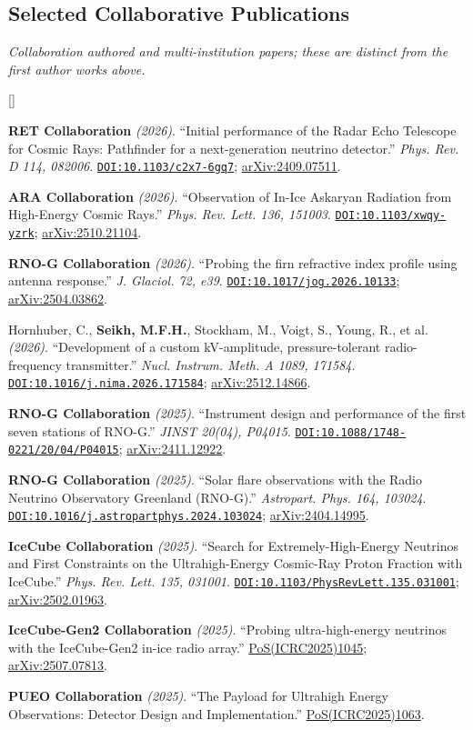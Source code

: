 \documentclass[10pt,letterpaper]{report}
\newcommand{\cvdate}[1]{{\normalfont\itshape\color{Muted}(#1)}}
\newcounter{cvitemrank}
\newenvironment{cvnumbered}[1]{%
  \setcounter{cvitemrank}{#1}%
  \begin{list}{\textcolor{Muted}{[\arabic{cvitemrank}]}}{%
    \setlength{\leftmargin}{2.25em}\setlength{\labelwidth}{1.65em}
    \setlength{\labelsep}{0.45em}\setlength{\itemindent}{0pt}
    \setlength{\itemsep}{0.3pt}\setlength{\topsep}{1.5pt}
    \setlength{\parsep}{0pt}\setlength{\partopsep}{0pt}}%
}{\end{list}}
\newcommand{\cvnumitem}{\item\addtocounter{cvitemrank}{-1}}
\newenvironment{cvpubnumbered}[1]{\begin{cvnumbered}{#1}\setlength{\itemsep}{2.2pt}\setlength{\topsep}{3pt}}{\end{cvnumbered}}
\newcommand{\doi}[1]{{\urlstyle{tt}\href{https://doi.org/#1}{\nolinkurl{DOI:#1}}}}
\newcommand{\arxiv}[1]{\href{https://arxiv.org/abs/#1}{arXiv:#1}}
\begin{document}
\subsection*{Selected Collaborative Publications}
\noindent\textit{Collaboration authored and multi-institution papers; these are distinct from the first author works above.}\vspace{2mm}
\begin{cvpubnumbered}{12}
    \cvnumitem \textbf{RET Collaboration} \cvdate{2026}. ``Initial performance of the Radar Echo Telescope for Cosmic Rays: Pathfinder for a next-generation neutrino detector.'' \textit{Phys. Rev. D 114, 082006}. \doi{10.1103/c2x7-6gq7}; \arxiv{2409.07511}.
    \cvnumitem \textbf{ARA Collaboration} \cvdate{2026}. ``Observation of In-Ice Askaryan Radiation from High-Energy Cosmic Rays.'' \textit{Phys. Rev. Lett. 136, 151003}. \doi{10.1103/xwqy-yzrk}; \arxiv{2510.21104}.
    \cvnumitem \textbf{RNO-G Collaboration} \cvdate{2026}. ``Probing the firn refractive index profile using antenna response.'' \textit{J. Glaciol. 72, e39}. \doi{10.1017/jog.2026.10133}; \arxiv{2504.03862}.
    \cvnumitem Hornhuber, C., \textbf{Seikh, M.F.H.}, Stockham, M., Voigt, S., Young, R., et al. \cvdate{2026}. ``Development of a custom kV-amplitude, pressure-tolerant radio-frequency transmitter.'' \textit{Nucl. Instrum. Meth. A 1089, 171584}. \doi{10.1016/j.nima.2026.171584}; \arxiv{2512.14866}.
    \cvnumitem \textbf{RNO-G Collaboration} \cvdate{2025}. ``Instrument design and performance of the first seven stations of RNO-G.'' \textit{JINST 20(04), P04015}. \doi{10.1088/1748-0221/20/04/P04015}; \arxiv{2411.12922}.
    \cvnumitem \textbf{RNO-G Collaboration} \cvdate{2025}. ``Solar flare observations with the Radio Neutrino Observatory Greenland (RNO-G).'' \textit{Astropart. Phys. 164, 103024}. \doi{10.1016/j.astropartphys.2024.103024}; \arxiv{2404.14995}.
    \cvnumitem \textbf{IceCube Collaboration} \cvdate{2025}. ``Search for Extremely-High-Energy Neutrinos and First Constraints on the Ultrahigh-Energy Cosmic-Ray Proton Fraction with IceCube.'' \textit{Phys. Rev. Lett. 135, 031001}. \doi{10.1103/PhysRevLett.135.031001}; \arxiv{2502.01963}.
    \cvnumitem \textbf{IceCube-Gen2 Collaboration} \cvdate{2025}. ``Probing ultra-high-energy neutrinos with the IceCube-Gen2 in-ice radio array.'' \href{https://doi.org/10.22323/1.501.1045}{PoS(ICRC2025)1045}; \arxiv{2507.07813}.
    \cvnumitem \textbf{PUEO Collaboration} \cvdate{2025}. ``The Payload for Ultrahigh Energy Observations: Detector Design and Implementation.'' \href{https://doi.org/10.22323/1.501.1063}{PoS(ICRC2025)1063}.

\end{cvpubnumbered}
\end{document}
